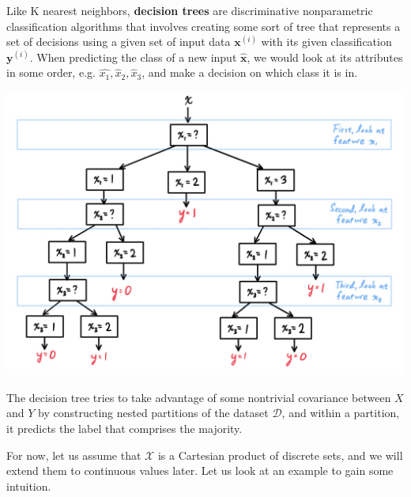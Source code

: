 \documentclass{article}
\begin{document}
    \begin{definition}
      Like K nearest neighbors, \textbf{decision trees} are discriminative nonparametric classification algorithms that involves creating some sort of tree that represents a set of decisions using a given set of input data $\mathbf{x}^{(i)}$ with its given classification $\mathbf{y}^{(i)}$. When predicting the class of a new input $\hat{\mathbf{x}}$, we would look at its attributes in some order, e.g. $\hat{x_1}, \hat{x}_2, \hat{x}_3$, and make a decision on which class it is in. 
      \begin{center}
          \includegraphics[scale=0.2]{img/general_decision_tree.jpg}
      \end{center}
      The decision tree tries to take advantage of some nontrivial covariance between $X$ and $Y$ by constructing nested partitions of the dataset $\mathcal{D}$, and within a partition, it predicts the label that comprises the majority. 
    \end{definition}

    For now, let us assume that $\mathcal{X}$ is a Cartesian product of discrete sets, and we will extend them to continuous values later. Let us look at an example to gain some intuition. 
\end{document}

